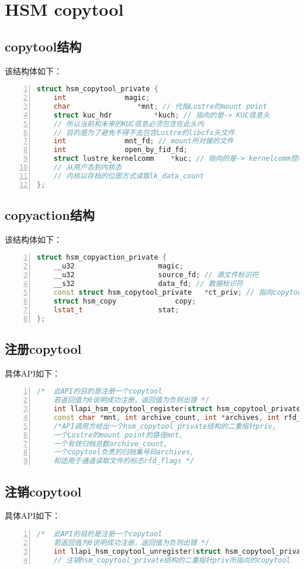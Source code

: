 \section{HSM copytool}

\subsection{copytool结构}
该结构体如下：
\begin{lstlisting}[language={c++},numbers=left]
struct hsm_copytool_private {
	int				 magic;
	char				*mnt; // 代指Lustre的mount point
    struct kuc_hdr			*kuch; // 指向的是-> KUC信息头
    // 所以当前和未来的KUC信息必须包含在此头内
    // 目的是为了避免不得不去包含Lustre的libcfs头文件
	int				 mnt_fd; // mount所对接的文件
	int				 open_by_fid_fd;
    struct lustre_kernelcomm	*kuc; // 指向的是-> kernelcomm控制结构
    // 从用户态到内核态
    // 内核以存档的位图方式读取lk_data_count
};
\end{lstlisting}


\subsection{copyaction结构}
该结构体如下：
\begin{lstlisting}[language={c++},numbers=left]
struct hsm_copyaction_private {
	__u32					 magic;
	__u32					 source_fd; // 源文件标识符
	__s32					 data_fd; // 数据标识符
	const struct hsm_copytool_private	*ct_priv; // 指向copytool的指针
	struct hsm_copy				 copy;
	lstat_t					 stat;
};
\end{lstlisting}


\subsection{注册copytool}
具体API如下：
\begin{lstlisting}[language={c++},numbers=left]
    /*  此API的目的是注册一个copytool
    若返回值为0说明成功注册，返回值为负则出错 */
    int llapi_hsm_copytool_register(struct hsm_copytool_private **priv,
    const char *mnt, int archive_count, int *archives, int rfd_flags);
    /*API调用方给出一个hsm_copytool_private结构的二重指针priv,
    一个Lustre的mount point的路径mnt,
    一个有效归档总数archive_count,
    一个copytool负责的归档集号码archives,
    和适用于通道读取文件的标志rfd_flags */
\end{lstlisting}

\subsection{注销copytool}
具体API如下：
\begin{lstlisting}[language={c++},numbers=left]
    /*  此API的目的是注册一个copytool
    若返回值为0说明成功注册，返回值为负则出错 */
    int llapi_hsm_copytool_unregister(struct hsm_copytool_private **priv);
    // 注销hsm_copytool_private结构的二重指针priv所指向的copytool
\end{lstlisting}

